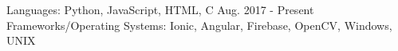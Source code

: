 \begin{cventries}
  \cventry
    {Languages: Python, JavaScript, HTML, C}
    {}
    {}
    {Aug. 2017 - Present}
    {Frameworks/Operating Systems: Ionic, Angular, Firebase, OpenCV, Windows, UNIX}
    {
    }
\end{cventries}
